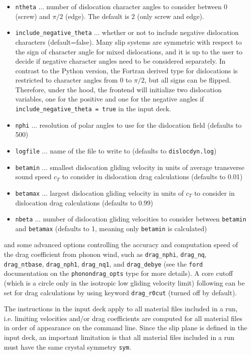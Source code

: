 \documentclass[11pt,letterpaper,oneside]{article}
\begin{document}
\begin{itemize}
\item \verb|ntheta| $\ldots$ number of dislocation character angles to consider between 0 (screw) and $\pi/2$ (edge). The default is 2 (only screw and edge).
\item \verb|include_negative_theta| $\ldots$ whether or not to include negative dislocation characters (default=false). Many slip systems are symmetric with respect to the sign of character angle for mixed dislocations, and it is up to the user to decide if negative character angles need to be considered separately.
In contrast to the Python version, the Fortran derived type for dislocations is restricted to character angles from 0 to $\pi/2$, but all signs can be flipped.
Therefore, under the hood, the frontend will initialize two dislocation variables, one for the positive and one for the negative angles if \verb|include_negative_theta = true| in the input deck.
\item \verb|nphi| $\ldots$ resolution of polar angles to use for the dislocation field (defaults to 500)
\item \verb|logfile| $\ldots$ name of the file to write to (defaults to \verb|dislocdyn.log|)
\item \verb|betamin| $\ldots$ smallest dislocation gliding velocity in units of average transverse sound speed $c_T$ to consider in dislocation drag calculations (defaults to 0.01)
\item \verb|betamax| $\ldots$ largest dislocation gliding velocity in units of $c_T$ to consider in dislocation drag calculations (defaults to 0.99)
\item \verb|nbeta| $\ldots$ number of  dislocation gliding velocities to consider between \verb|betamin| and \verb|betamax| (defaults to 1, meaning only \verb|betamin| is calculated)
\end{itemize}
and some advanced options controlling the accuracy and computation speed of the drag coefficient from phonon wind, such as \verb|drag_nphi|, \verb|drag_nq|, \verb|drag_ntbase|, \verb|drag_nph1|, \verb|drag_nq1|, and \verb|drag_debye| (see the \verb|ford| documentation on the \verb|phonondrag_opts| type for more details).
A core cutoff (which is a circle only in the isotropic low gliding velocity limit) following \cite{Alshits:1979} can be set for drag calculations by using keyword \verb|drag_r0cut| (turned off by default).

The instructions in the input deck apply to all material files included in a run, i.e. limiting velocities and/or drag coefficients are computed for all material files in order of appearance on the command line.
Since the slip plane is defined in the input deck, an important limitation is that all material files included in a run must have the same crystal symmetry \verb|sym|.
\end{document}

